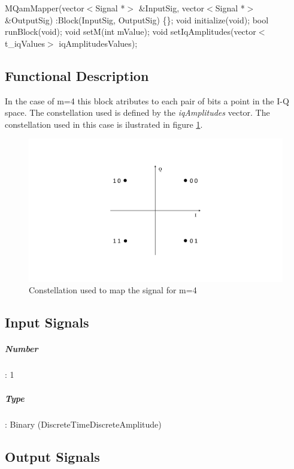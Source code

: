 MQamMapper(vector$<$Signal *$>$ \&InputSig, vector$<$Signal *$>$ \&OutputSig) :Block(InputSig, OutputSig) \{\};
\bigbreak	
void initialize(void);
\bigbreak	
bool runBlock(void);
\bigbreak	
void setM(int mValue);
\bigbreak	
void setIqAmplitudes(vector$<$t\_iqValues$>$ iqAmplitudesValues);

\subsection*{Functional Description}

In the case of m=4 this block atributes to each pair of bits a point in the I-Q space. The constellation used is defined by the \textit{iqAmplitudes} vector. The constellation used in this case is ilustrated in figure \ref{constellation}.

\begin{figure}
	\centering
	\includegraphics[width=\textwidth]{./sdf/m_qam_system/figures/MQAM_constellation.pdf}
	
	\caption{Constellation used to map the signal for m=4 }\label{constellation}
	
\end{figure}

\subsection*{Input Signals}

\subparagraph*{Number}: 1

\subparagraph*{Type}: Binary (DiscreteTimeDiscreteAmplitude)

\subsection*{Output Signals}


